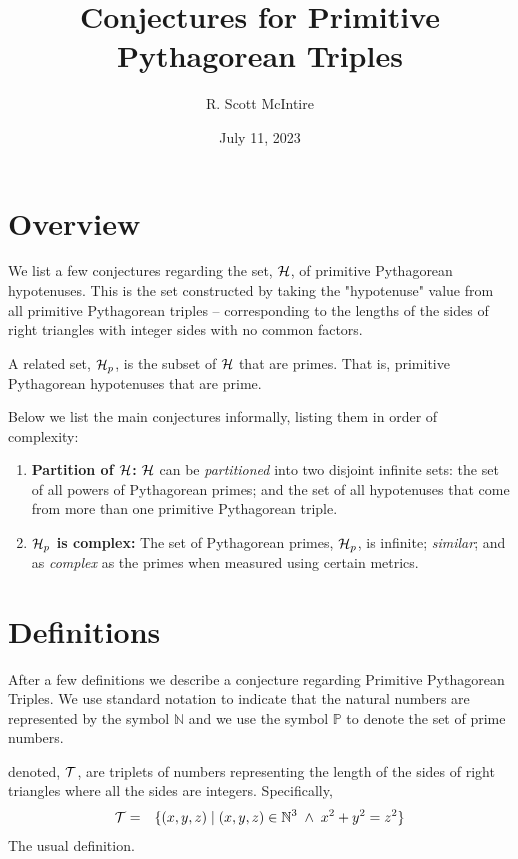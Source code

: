 \documentclass{article}
\title{Conjectures for Primitive Pythagorean Triples}
\author{R. Scott McIntire}
\date{July 11, 2023}
\theoremstyle{definition}
\begin{document}
\maketitle


\section{Overview}
We list a few conjectures regarding the set, ${\cal H}$, of primitive Pythagorean hypotenuses. 
This is the set constructed by taking the "hypotenuse" value from all primitive Pythagorean triples -- corresponding to the lengths of the sides of 
right triangles with integer sides with no common factors.

A related set, ${\cal H}_p$, is the subset of ${\cal H}$ that are primes. That is, primitive Pythagorean hypotenuses that are prime.

Below we list the main conjectures informally, listing them in order of complexity:
\begin{enumerate}
  \item{{\bf Partition of ${\cal H}$:\/} ${\cal H}$ can be {\em partitioned\/} into two disjoint infinite sets: 
    the set of all powers of Pythagorean primes; and the set of all hypotenuses that come from more than one primitive Pythagorean triple.}
  \item{{\bf ${\cal H}_p$ is complex:\/} The set of Pythagorean primes, ${\cal H}_p$, is infinite; {\em similar\/}; and as {\em complex\/} as the primes when measured using certain metrics.}
\end{enumerate}


\section{Definitions}
After a few definitions we describe a conjecture regarding Primitive Pythagorean Triples.
We use standard notation to indicate that the natural numbers are represented by the symbol $\mathbb{N}$ and 
we use the symbol $\mathbb{P}$ to denote the set of prime numbers.


 denoted, ${\cal T}$, are  triplets of numbers representing the length of the sides of
right triangles where all the sides are integers. Specifically,
\begin{eqnarray}
  {\cal T} & = & \{ (x,y,z) \; | \; (x,y,z) \in \mathbb{N}^3 \; \wedge \; x^2 + y^2 = z^2 \}
\end{eqnarray}
The usual definition.
\end{document}
